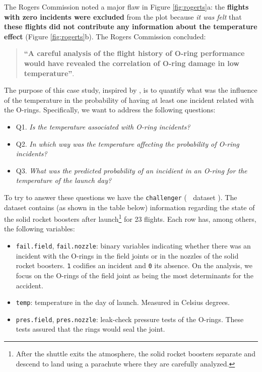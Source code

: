 \documentclass[]{book}
\providecommand{\tightlist}{%
  \setlength{\itemsep}{0pt}\setlength{\parskip}{0pt}}
\let\rmarkdownfootnote\footnote%
\def\footnote{\protect\rmarkdownfootnote}
\theoremstyle{definition}
\theoremstyle{definition}
\theoremstyle{definition}
\theoremstyle{remark}
\begin{document}
The Rogers Commission noted a major flaw in Figure \ref{fig:rogerts}a:
the \textbf{flights with zero incidents were excluded} from the plot
because \emph{it was felt} that \textbf{these flights did not contribute
any information about the temperature effect} (Figure
\ref{fig:rogerts}b). The Rogers Commission concluded:

\begin{quote}
\textbf{``A careful analysis of the flight history of O-ring performance
would have revealed the correlation of O-ring damage in low
temperature''}.
\end{quote}

The purpose of this case study, inspired by \citet{Dalal1989}, is to
quantify what was the influence of the temperature in the probability of
having at least one incident related with the O-rings. Specifically, we
want to address the following questions:

\begin{itemize}
\tightlist
\item
  Q1. \emph{Is the temperature associated with O-ring incidents?}
\item
  Q2. \emph{In which way was the temperature affecting the probability
  of O-ring incidents?}
\item
  Q3. \emph{What was the predicted probability of an incidient in an
  O-ring for the temperature of the launch day?}
\end{itemize}

To try to answer these questions we have the \texttt{challenger}
(\textcolor{white}{[}\faTable\textcolor{white}{]} dataset ). The dataset
contains (as shown in the table below) information regarding the state
of the solid rocket boosters after launch\footnote{After the shuttle
  exits the atmosphere, the solid rocket boosters separate and descend
  to land using a parachute where they are carefully analyzed.} for 23
flights. Each row has, among others, the following variables:

\begin{itemize}
\tightlist
\item
  \texttt{fail.field}, \texttt{fail.nozzle}: binary variables indicating
  whether there was an incident with the O-rings in the field joints or
  in the nozzles of the solid rocket boosters. \texttt{1} codifies an
  incident and \texttt{0} its absence. On the analysis, we focus on the
  O-rings of the field joint as being the most determinants for the
  accident.
\item
  \texttt{temp}: temperature in the day of launch. Measured in Celsius
  degrees.
\item
  \texttt{pres.field}, \texttt{pres.nozzle}: leak-check pressure tests
  of the O-rings. These tests assured that the rings would seal the
  joint.
\end{itemize}
\end{document}
